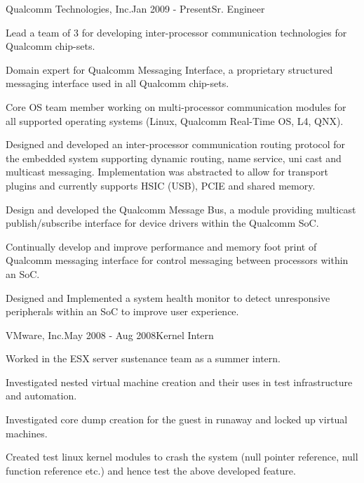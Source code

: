 \begin{rSubsection}{Qualcomm Technologies, Inc.}{Jan 2009 - Present}{Sr. Engineer}{}
  \item Lead a team of 3 for developing inter-processor communication technologies for Qualcomm chip-sets.
  \item Domain expert for Qualcomm Messaging Interface, a proprietary structured messaging interface used in all Qualcomm chip-sets.
  \item Core OS team member working on multi-processor communication modules for all supported operating systems (Linux, Qualcomm Real-Time OS, L4, QNX).
  \item Designed and developed an inter-processor communication routing protocol for the embedded system supporting dynamic routing, name service, uni cast and multicast messaging. Implementation was abstracted to allow for transport plugins and currently supports HSIC (USB), PCIE and shared memory.
  \item Design and developed the Qualcomm Message Bus, a module providing multicast publish/subscribe interface for device drivers within the Qualcomm SoC. 
  \item Continually develop and improve performance and memory foot print of Qualcomm messaging interface for control messaging between processors within an SoC.
  \item Designed and Implemented a system health monitor to detect unresponsive peripherals within an SoC to improve user experience.
\end{rSubsection}


\begin{rSubsection}{VMware, Inc.}{May 2008 - Aug 2008}{Kernel Intern}{}
  \item Worked in the ESX server sustenance team as a summer intern.
  \item Investigated nested virtual machine creation and their uses in test infrastructure and automation.
  \item Investigated core dump creation for the guest in runaway and locked up virtual machines.
  \item Created test linux kernel modules to crash the system (null pointer reference, null function reference etc.) and hence test the above developed feature.
\end{rSubsection}


